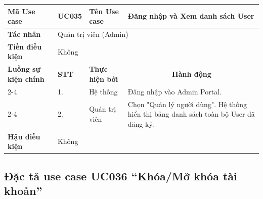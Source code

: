 \documentclass[../main.tex]{subfiles}
\begin{document}
\begin{longtable}{|p{2.7cm}|p{0.8cm}|p{2.6cm}|p{7.3cm}|}
\hline
\cellcolor[HTML]{D5F5E3}\textbf{Mã Use case} & \multicolumn{1}{l|}{UC035} & \cellcolor[HTML]{D5F5E3}\textbf{Tên Use case} & Đăng nhập và Xem danh sách User \\ \hline
\cellcolor[HTML]{D5F5E3}\textbf{Tác nhân} & \multicolumn{3}{p{10.7cm}|}{Quản trị viên (Admin)} \\ \hline
\cellcolor[HTML]{D5F5E3}\textbf{Tiền điều kiện} & \multicolumn{3}{p{10.7cm}|}{Không} \\ \hline

\cellcolor[HTML]{D5F5E3}\textbf{Luồng sự kiện chính} & \cellcolor[HTML]{FDEBD0}\textbf{STT} & \cellcolor[HTML]{FDEBD0}\textbf{Thực hiện bởi} & \multicolumn{1}{c|}{\cellcolor[HTML]{FDEBD0}\textbf{Hành động}} \\ \cline{2-4} 
\cellcolor[HTML]{D5F5E3} & 1. & Hệ thống & Đăng nhập vào Admin Portal. \\ \cline{2-4} 
\cellcolor[HTML]{D5F5E3} & 2. & Quản trị viên & Chọn "Quản lý người dùng". Hệ thống hiển thị bảng danh sách toàn bộ User đã đăng ký. \\ \hline

\cellcolor[HTML]{D5F5E3}\textbf{Hậu điều kiện} & \multicolumn{3}{p{10.7cm}|}{Không} \\ \hline
\end{longtable}
\endgroup

\subsection{Đặc tả use case UC036 ``Khóa/Mở khóa tài khoản''}
\vspace{0.5cm}

\begingroup
\renewcommand{\arraystretch}{1.5}
\end{document}
